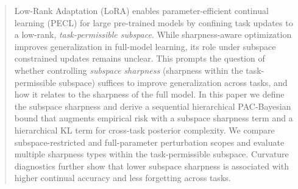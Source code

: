 \documentclass{article}
\theoremstyle{plain}
\theoremstyle{definition}
\theoremstyle{remark}
\begin{document}

\printAffiliationsAndNotice{}  %

\begin{abstract}
Low-Rank Adaptation (LoRA) enables parameter-efficient continual learning (PECL) for large pre-trained models by confining task updates to a low-rank, \emph{task-permissible subspace}.
While sharpness-aware optimization improves generalization in full-model learning, its role under subspace constrained updates remains unclear. This prompts the question of whether controlling \emph{subspace sharpness} (sharpness within the {task-permissible subspace}) suffices to improve generalization across tasks, and how it relates to the sharpness of the full model.
In this paper we define the subspace sharpness and derive a sequential hierarchical PAC-Bayesian bound that augments empirical risk with a subspace sharpness term and a hierarchical KL term for cross-task posterior complexity. We compare subspace-restricted and full-parameter perturbation scopes and evaluate multiple sharpness types within the task-permissible subspace.
Curvature diagnostics further show that lower subspace sharpness is associated with higher continual accuracy and less forgetting across tasks. 
\end{abstract}



\end{document}
